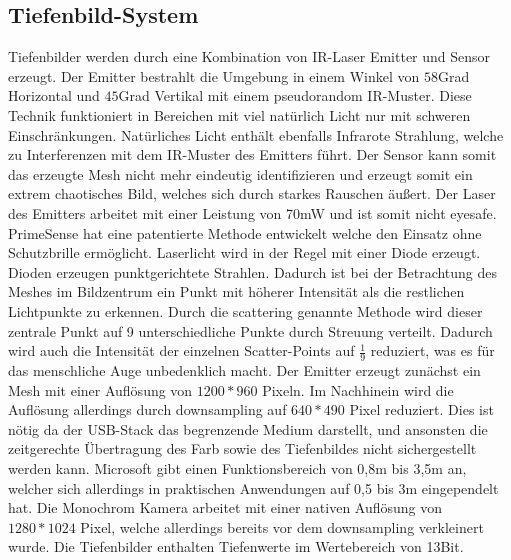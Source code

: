		\subsection{Tiefenbild-System}
		Tiefenbilder werden durch eine Kombination von IR-Laser Emitter und Sensor erzeugt. Der Emitter bestrahlt die Umgebung in einem Winkel von $58$Grad Horizontal und $45$Grad Vertikal mit einem pseudorandom IR-Muster. Diese Technik funktioniert in Bereichen mit viel natürlich Licht nur mit schweren Einschränkungen. Natürliches Licht enthält ebenfalls Infrarote Strahlung, welche zu Interferenzen mit dem IR-Muster des Emitters führt. Der Sensor kann somit das erzeugte Mesh nicht mehr eindeutig identifizieren und erzeugt somit ein extrem chaotisches Bild, welches sich durch starkes Rauschen äußert. Der Laser des Emitters arbeitet mit einer Leistung von 70mW und ist somit nicht eyesafe. PrimeSense hat eine patentierte Methode entwickelt welche den Einsatz ohne Schutzbrille ermöglicht. Laserlicht wird in der Regel mit einer Diode erzeugt. Dioden erzeugen punktgerichtete Strahlen. Dadurch ist bei der Betrachtung des Meshes im Bildzentrum ein Punkt mit höherer Intensität als die restlichen Lichtpunkte zu erkennen. Durch die scattering genannte Methode wird dieser zentrale Punkt auf 9 unterschiedliche Punkte durch Streuung verteilt. Dadurch wird auch die Intensität der einzelnen Scatter-Points auf $\frac{1}{9}$ reduziert, was es für das menschliche Auge unbedenklich macht. Der Emitter erzeugt zunächst ein Mesh mit einer Auflösung von $1200*960$ Pixeln. Im Nachhinein wird die Auflösung allerdings durch downsampling auf $640*490$ Pixel reduziert. Dies ist nötig da der USB-Stack das begrenzende Medium darstellt, und ansonsten die zeitgerechte Übertragung des Farb sowie des Tiefenbildes nicht sichergestellt werden kann. Microsoft gibt einen Funktionsbereich von 0,8m bis 3,5m an, welcher sich allerdings in praktischen Anwendungen auf 0,5 bis 3m eingependelt hat. Die Monochrom Kamera arbeitet mit einer nativen Auflösung von $1280*1024$ Pixel, welche allerdings bereits vor dem downsampling verkleinert wurde. Die Tiefenbilder enthalten Tiefenwerte im Wertebereich von 13Bit.
